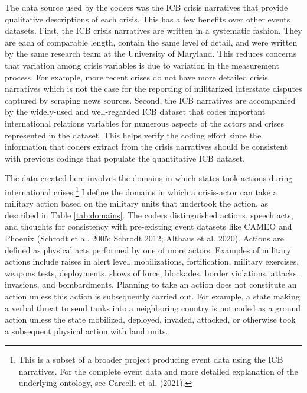 \documentclass[
]{article}
\begin{document}
The data source used by the coders was the ICB crisis narratives that provide qualitative descriptions of each crisis. This has a few benefits over other events datasets. First, the ICB crisis narratives are written in a systematic fashion. They are each of comparable length, contain the same level of detail, and were written by the same research team at the University of Maryland. This reduces concerns that variation among crisis variables is due to variation in the measurement process. For example, more recent crises do not have more detailed crisis narratives which is not the case for the reporting of militarized interstate disputes captured by scraping news sources. Second, the ICB narratives are accompanied by the widely-used and well-regarded ICB dataset that codes important international relations variables for numerous aspects of the actors and crises represented in the dataset. This helps verify the coding effort since the information that coders extract from the crisis narratives should be consistent with previous codings that populate the quantitative ICB dataset.

The data created here involves the domains in which states took actions during international crises.\footnote{This is a subset of a broader project producing event data using the ICB narratives. For the complete event data and more detailed explanation of the underlying ontology, see Carcelli et al. (2021).} I define the domains in which a crisis-actor can take a military action based on the military units that undertook the action, as described in Table \ref{tab:domains}. The coders distinguished actions, speech acts, and thoughts for consistency with pre-existing event datasets like CAMEO and Phoenix (Schrodt et al. 2005; Schrodt 2012; Althaus et al. 2020). Actions are defined as physical acts performed by one of more actors. Examples of military actions include raises in alert level, mobilizations, fortification, military exercises, weapons tests, deployments, shows of force, blockades, border violations, attacks, invasions, and bombardments. Planning to take an action does not constitute an action unless this action is subsequently carried out. For example, a state making a verbal threat to send tanks into a neighboring country is not coded as a ground action unless the state mobilized, deployed, invaded, attacked, or otherwise took a subsequent physical action with land units.
\end{document}
